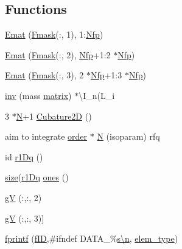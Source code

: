 \subsection*{Functions}
\begin{DoxyCompactItemize}
\item 
\hyperlink{a00473_a897368b80c690bb1d86a139b2e32f062}{Emat} (\hyperlink{a00575_a53fedbe0b7d30bbdae17dd4984fb3177}{Fmask}(\+:, 1), 1\+:\hyperlink{a00575_a20f422f104b7455cf2904b755786b44f}{Nfp})
\item 
\hyperlink{a00473_a60824f742b56f2e7937c971600df7da0}{Emat} (\hyperlink{a00575_a53fedbe0b7d30bbdae17dd4984fb3177}{Fmask}(\+:, 2), \hyperlink{a00575_a20f422f104b7455cf2904b755786b44f}{Nfp}+1\+:2 $\ast$\hyperlink{a00575_a20f422f104b7455cf2904b755786b44f}{Nfp})
\item 
\hyperlink{a00473_a1afcdf2927c1ba1a2c01991ac8791bab}{Emat} (\hyperlink{a00575_a53fedbe0b7d30bbdae17dd4984fb3177}{Fmask}(\+:, 3), 2 $\ast$\hyperlink{a00575_a20f422f104b7455cf2904b755786b44f}{Nfp}+1\+:3 $\ast$\hyperlink{a00575_a20f422f104b7455cf2904b755786b44f}{Nfp})
\item 
\hyperlink{a00473_a0c752aad07d6c7e22d2e63df41ccdf8b}{inv} (mass \hyperlink{a01014_af07ff1035f34d77764ff516f110e6832}{matrix}) $\ast$\textbackslash{}I\+\_\+n(L\+\_\+i
\item 
3 $\ast$\hyperlink{a00473_a5b9c4563028063ee53b517cce9aa701b}{N}+1 \hyperlink{a00473_ad944bbd4c17e82aa32dbac520e9a4d6b}{Cubature2D} ()
\item 
aim to integrate \hyperlink{a00611_aab21ede0c02820806e77fd7890ee6bd7}{order} $\ast$ \hyperlink{a00473_a5b9c4563028063ee53b517cce9aa701b}{N} (isoparam) rfq
\item 
id \hyperlink{a00473_a79d685dcbb9027705142b2a8b912aa1e}{r1\+Dq} ()
\item 
\hyperlink{a00611_ad6cb0afbbe6ea4f56407890be2533966}{size}(\hyperlink{a00473_a79d685dcbb9027705142b2a8b912aa1e}{r1\+Dq} \hyperlink{a00473_a6d4fbbd46e46569dab2b0ad8372e0220}{ones} ()
\item 
\hyperlink{a00473_a1e95c512464cc7b20598dcb3f6eaffe3}{gV} (\+:,\+:, 2)
\item 
\hyperlink{a00473_ab16464170b2d4f6a6b117aae1d91f963}{gV} (\+:,\+:, 3)\mbox{]}
\item 
\hyperlink{a00473_a1c26c3e6fd09ad3f614fd2a28762dfe8}{fprintf} (\hyperlink{a00473_ae0527cbfd56392d5095a691bbf10ba5b}{f\+ID},\textquotesingle{}\#ifndef D\+A\+T\+A\+\_\+\%\hyperlink{a00623_a781a04ab095280f838ff3eb0e51312e0}{s\textbackslash{}n}\textquotesingle{}, \hyperlink{a00473_a9e84386471d07238c03b10507f58eba9}{elem\+\_\+type})

\end{DoxyCompactItemize}
